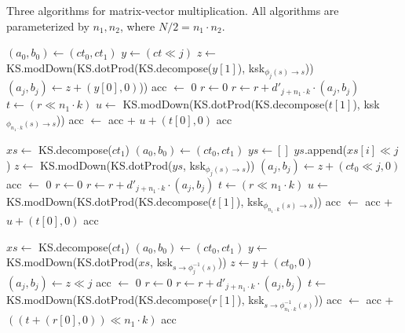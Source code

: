\documentclass[../fheimpl.tex]{subfiles}
\begin{document}
    \begin{algorithm}
		\caption{Three algorithms for matrix-vector multiplication. All algorithms are parameterized by $n_1, n_2$, where $N/2=n_1\cdot n_2$.}\label{alg:batchrotations}
		\begin{algorithmic}[1]
				\State $(a_0, b_0) \gets (ct_0, ct_1)$
                    \State $y \gets (ct \ll j)$
                    \State $z \gets$ KS.modDown(KS.dotProd(KS.decompose($y[1]$), ksk$_{\phi_{j}(s)\rightarrow s}$))
                    \State $(a_j, b_j) \gets z + (y[0], 0)$))
				\EndFor
				\State acc $\gets$ 0
                    \State $r\gets 0$
                        \State $r \gets r + d'_{j+n_1\cdot k}\cdot (a_j, b_j)$
                    \EndFor
                    \State $t\gets (r\ll n_1\cdot k)$
                    \State $u \gets$ KS.modDown(KS.dotProd(KS.decompose($t[1]$), ksk$_{\phi_{n_1\cdot k}(s)\rightarrow s}$))
                    \State acc $\gets$ acc + $u + (t[0], 0)$
				\EndFor
				\State \Return acc
            \EndProcedure
			
				\State $xs \gets$ KS.decompose($ct_1$)
				\State $(a_0, b_0) \gets (ct_0, ct_1)$
                    \State $ys \gets []$
                        \State $ys$.append($xs[i] \ll j$) 
                    \EndFor
                    \State $z \gets$ KS.modDown(KS.dotProd($ys$, ksk$_{\phi_{j}(s)\rightarrow s}$))
                    \State $(a_j, b_j) \gets z + (ct_0 \ll j, 0)$
				\EndFor
				\State acc $\gets$ 0
                    \State $r\gets 0$
                        \State $r \gets r + d'_{j+n_1\cdot k}\cdot (a_j, b_j)$
                    \EndFor
                    \State $t\gets (r\ll n_1\cdot k)$
                    \State $u \gets$ KS.modDown(KS.dotProd(KS.decompose($t[1]$), ksk$_{\phi_{n_1\cdot k}(s)\rightarrow s}$))
                    \State acc $\gets$ acc + $u + (t[0], 0)$
				\EndFor
				\State \Return acc
            \EndProcedure
			
				\State $xs \gets$ KS.decompose($ct_1$)
				\State $(a_0, b_0) \gets (ct_0, ct_1)$
                    \State $y \gets$ KS.modDown(KS.dotProd($xs$, ksk$_{s\rightarrow \phi^{-1}_{j}(s)}$))
                    \State $z \gets y + (ct_0, 0)$
                    \State $(a_j, b_j) \gets z\ll j$
				\EndFor
				\State acc $\gets$ 0
                    \State $r\gets 0$
						\State $r \gets r +  d'_{j+n_1\cdot k}\cdot (a_j, b_j)$
					\EndFor
					\State $t \gets$ KS.modDown(KS.dotProd(KS.decompose($r[1]$), ksk$_{s \rightarrow \phi^{-1}_{n_1\cdot k}(s)}$))
					\State acc $\gets$ acc + $((t+(r[0], 0))\ll n_1\cdot k)$
				\EndFor
				\State \Return acc
            \EndProcedure
			

\end{algorithmic}
\end{algorithm}
\end{document}
